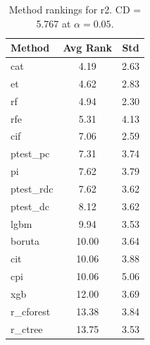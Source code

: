\begin{table}[h]
\centering
\caption{Method rankings for r2. CD = 5.767 at $\alpha=0.05$.}
\label{tab:ranks_r2}
\begin{tabular}{lcc}
\toprule
Method & Avg Rank & Std \\
\midrule
cat & 4.19 & 2.63 \\
et & 4.62 & 2.83 \\
rf & 4.94 & 2.30 \\
rfe & 5.31 & 4.13 \\
cif & 7.06 & 2.59 \\
ptest_pc & 7.31 & 3.74 \\
pi & 7.62 & 3.79 \\
ptest_rdc & 7.62 & 3.62 \\
ptest_dc & 8.12 & 3.62 \\
lgbm & 9.94 & 3.53 \\
boruta & 10.00 & 3.64 \\
cit & 10.06 & 3.88 \\
cpi & 10.06 & 5.06 \\
xgb & 12.00 & 3.69 \\
r_cforest & 13.38 & 3.84 \\
r_ctree & 13.75 & 3.53 \\
\bottomrule
\end{tabular}
\end{table}